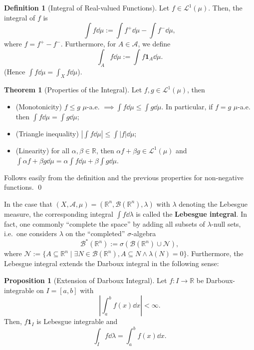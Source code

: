 \documentclass[
]{article}
\theoremstyle{definition}
\newtheorem{theorem}{Theorem}
\newtheorem{prop}{Proposition}
\theoremstyle{definition}
\newtheorem{definition}{Definition}[section]
\begin{document}
\begin{definition}[Integral of Real-valued Functions]
  Let \(f \in \mathcal{L}^1(\mu)\). Then, the integral of \(f\) is 
  \[\int f \dd \mu := \int f^+ \dd \mu - \int f^- \dd \mu,\]
  where \(f = f^+ - f^-\). Furthermore, for \(A \in \mathcal{A}\), we define
  \[\int_A f \dd \mu := \int f \mathbf{1}_A \dd \mu.\]
  (Hence \(\int f \dd \mu = \int_X f \dd \mu\)).
\end{definition}

\begin{theorem}[Properties of the Integral]
  Let \(f, g \in \mathcal{L}^1(\mu)\), then 
  \begin{itemize}
    \item (Monotonicity) \(f \le g\) \(\mu\)-a.e. \(\implies \int f \dd \mu 
      \le \int g \dd \mu\). In particular, if \(f = g\) \(\mu\)-a.e. then 
      \(\int f \dd \mu = \int g \dd \mu\);
    \item (Triangle inequality) \(\left| \int f \dd \mu \right| \le \int |f| \dd \mu\);
    \item (Linearity) for all \(\alpha, \beta \in \mathbb{R}\), then 
      \(\alpha f + \beta g \in \mathcal{L}^1(\mu)\) and 
      \(\int \alpha f + \beta g \dd \mu = \alpha \int f \dd \mu + \beta \int g \dd \mu\).
  \end{itemize}
\end{theorem}
\proof

Follows easily from the definition and the previous properties for
non-negative functions. \qed

In the case that
\((X, \mathcal{A}, \mu) = (\mathbb{R}^n, \mathcal{B}(\mathbb{R}^n), \lambda)\)
with \(\lambda\) denoting the Lebesgue measure, the corresponding
integral \(\int f \dd \lambda\) is called the \textbf{Lebesgue
integral}. In fact, one commonly ``complete the space'' by adding all
subsets of \(\lambda\)-null sets, i.e.~one considers \(\lambda\) on the
``completed'' \(\sigma\)-algebra
\[\mathcal{B}^*(\mathbb{R}^n) := \sigma(\mathcal{B}(\mathbb{R}^n) \cup \mathcal{N}),\]
where
\(\mathcal{N} := \{A \subseteq \mathbb{R}^n \mid \exists N \in  \mathcal{B}(\mathbb{R}^n), A \subseteq N \wedge \lambda(N) = 0 \}\).
Furthermore, the Lebesgue integral extends the Darboux integral in the
following sense:

\begin{prop}[Extension of Darboux Integral]
  Let \(f : I \to \mathbb{R}\) be Darboux-integrable on \(I = [a, b]\) with 
  \[\left|\int_a^b f(x) \dd x\right| < \infty.\]
  Then, \(f\mathbf{1}_I\) is Lebesgue integrable and 
  \[\int_I f \dd \lambda = \int_a^b f(x) \dd x.\]
\end{prop}
\proof
\end{document}
